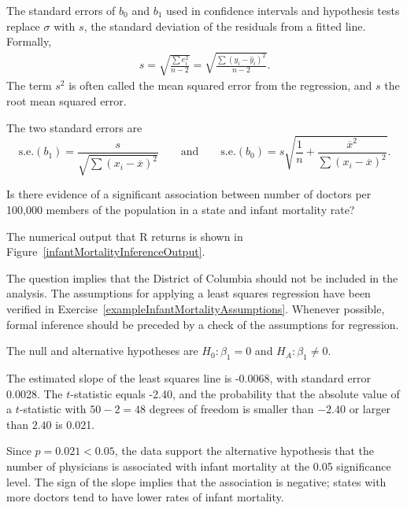 The standard errors of $b_0$ and $b_1$ used in confidence intervals and hypothesis tests replace $\sigma$ with $s$, the standard deviation of the residuals from a fitted line. Formally, 
\begin{align}
 s = \sqrt{\frac{\sum e^{2}_{i}}{n-2}} =  \sqrt{\frac{\sum (y_{i}-\hat{y}_{i})^{2}}{n-2}}.
  \label{equation:regressionMSE}
\end{align}
The term $s^2$ is often called the mean squared error from the regression, and $s$ the root mean squared error. 

The two standard errors are
\[\text{s.e.}(b_1) = \frac{s}{\sqrt{\sum(x_i -\overline{x})^2}}  \qquad \text{and} \qquad \text{s.e.}(b_0) = s \sqrt{\frac{1}{n} + \frac{\overline{x}^2}
	{\sum(x_i - \overline{x})^2}}. \]

\textD{\newpage}

\begin{examplewrap}
\begin{nexample}{Is there evidence of a significant association between number of doctors per 100,000 members of the population in a state and infant mortality rate? 
		
The numerical output that \textsf{R} returns is shown in Figure~\ref{infantMortalityInferenceOutput}.\footnotemark{}}\label{exampleInfantMortalityInference}%
The question implies that the District of Columbia should not be included in the analysis. The assumptions for applying a least squares regression have been verified in Exercise~\ref{exampleInfantMortalityAssumptions}. Whenever possible, formal inference should be preceded by a check of the assumptions for regression.

The null and alternative hypotheses are $H_0:\beta_1 = 0$ and $H_A:\beta_1 \neq 0.$	

The estimated slope of the least squares line is -0.0068, with standard error 0.0028. The $t$-statistic equals -2.40, and the probability that the absolute value of a $t$-statistic with $50-2=48$ degrees of freedom is smaller than $-2.40$ or larger than $2.40$ is 0.021. 

Since $p = 0.021 < 0.05$, the data support the alternative hypothesis that the number of physicians is associated with infant mortality at the 0.05 significance level. The sign of the slope implies that the association is negative; states with more doctors tend to have lower rates of infant mortality.
\end{nexample}
\end{examplewrap}

